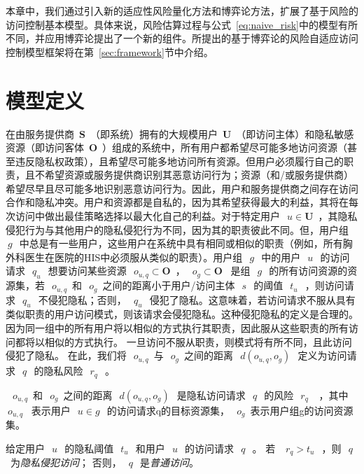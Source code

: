 本章中，我们通过引入新的适应性风险量化方法和博弈论方法，扩展了基于风险的访问控制基本模型。具体来说，风险估算过程与公式~\ref{eq:naive_risk}中的模型有所不同，并应用博弈论提出了一个新的组件。所提出的基于博弈论的风险自适应访问控制模型框架将在第~\ref{sec:framework}节中介绍。


\section{模型定义}
\label{sec:notations}


在由服务提供商~$\mathbf{S}$~（即系统）拥有的大规模用户~$\mathbf{U}$~（即访问主体）和隐私敏感资源（即访问客体~$\mathbf{O}$~）组成的系统中，所有用户都希望尽可能多地访问资源（甚至违反隐私权政策），且希望尽可能多地访问所有资源。但用户必须履行自己的职责，且不希望资源或服务提供商识别其恶意访问行为；资源（和/或服务提供商）希望尽早且尽可能多地识别恶意访问行为。因此，用户和服务提供商之间存在访问合作和隐私冲突。用户和资源都是自私的，因为其希望获得最大的利益，其将在每次访问中做出最佳策略选择以最大化自己的利益。对于特定用户~$~u \in \mathbf{U}$~，其隐私侵犯行为与其他用户的隐私侵犯行为不同，因为其的职责彼此不同。但，用户组~$~g~$~中总是有一些用户，这些用户在系统中具有相同或相似的职责（例如，所有胸外科医生在医院的HIS中必须服从类似的职责）。用户组~$~g~$~中的用户~$~u~$~的访问请求~$~q_u~$~想要访问某些资源~$~o_{u,q} \subset \mathbf{O}$~，~$~o_{g} \subset \mathbf{O}$~ 是组~$~g~$~的所有访问资源的资源集，若~$~o_{u,q}$~和~$~o_{g}$~之间的距离小于用户/访问主体~$~s~$~的阈值~$~t_u~$~，则访问请求~$~q_u~$~不侵犯隐私；否则，~$~q_u~$~侵犯了隐私。这意味着，若访问请求不服从具有类似职责的用户访问模式，则该请求会侵犯隐私。这种侵犯隐私的定义是合理的。因为同一组中的所有用户将以相似的方式执行其职责，因此服从这些职责的所有访问都将以相似的方式执行。 一旦访问不服从职责，则模式将有所不同，且此访问侵犯了隐私。 在此，我们将~$~o_{u,q}$~与~$~o_{g}$~之间的距离~$~d(o_{u,q},o_{g})~$~定义为访问请求~$~q~$~的隐私风险~$~r_q~$~。
\begin{definition}
	\label{def:privacy_risk}
	~$~o_{u,q}$~和~$~o_{g}$~之间的距离~$~d(o_{u,q},o_{g})~$~是隐私访问请求~$~q~$~的风险~$~r_q~$~ ，其中~$~o_{u,q}$~ 表示用户~$~u \in g~$~的访问请求q的目标资源集，~$~o_{g}$~表示用户组g的访问资源集。
\end{definition}

\begin{definition}
	\label{def:privacy_violation_access}
	
	给定用户~$~u~$~的隐私阈值~$~t_u~$~和用户~$~u~$~的访问请求~$~q~$~。 若 ~$~r_q > t_u~$~，则~$~q~$~为\textit{隐私侵犯访问}； 否则，~$~q~$~是\textit{普通访问}。
\end{definition}



